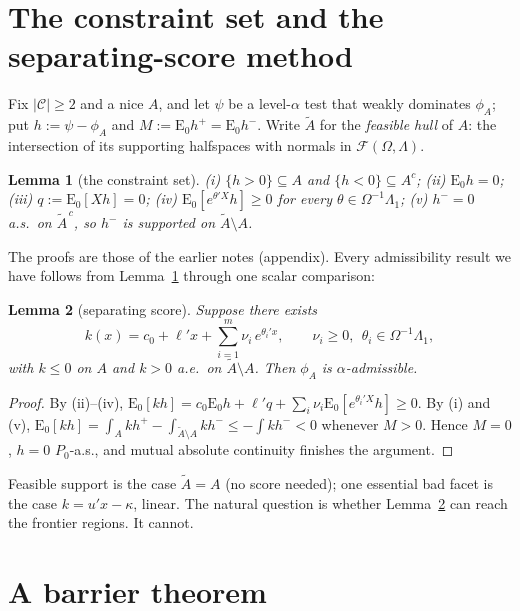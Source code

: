 \documentclass[12pt]{article}
\newtheorem{lemc}{Lemma}[section]
\theoremstyle{remark}
\newcommand{\E}{\mathrm E}
\newcommand{\cC}{\mathcal C}
\newcommand{\cF}{\mathcal F}
\newcommand{\wt}{\widetilde}
\begin{document}
\section{The constraint set and the separating-score method}

Fix $|\cC|\ge2$ and a nice $A$, and let $\psi$ be a level-$\alpha$ test that
weakly dominates $\phi_A$; put $h:=\psi-\phi_A$ and
$M:=\E_0h^+=\E_0h^-$. Write $\wt A$ for the \emph{feasible hull} of $A$:
the intersection of its supporting halfspaces with normals in
$\cF(\Omega,\Lambda)$.

\begin{lemc}[the constraint set]\label{lem:constraints}
(i) $\{h>0\}\subseteq A$ and $\{h<0\}\subseteq A^c$;
(ii) $\E_0h=0$;
(iii) $q:=\E_0[Xh]=0$;
(iv) $\E_0[e^{\theta'X}h]\ge0$ for every $\theta\in\Omega^{-1}\Lambda_1$;
(v) $h^-=0$ a.s.\ on $\wt A^{\,c}$, so $h^-$ is supported on
$\wt A\setminus A$.
\end{lemc}

The proofs are those of the earlier notes (appendix). Every admissibility
result we have follows from Lemma~\ref{lem:constraints} through one scalar
comparison:

\begin{lemc}[separating score]\label{lem:score}
Suppose there exists
\begin{equation}\label{eq:score-class}
k(x)=c_0+\ell'x+\sum_{i=1}^m\nu_i\,e^{\theta_i'x},
\qquad
\nu_i\ge0,\ \ \theta_i\in\Omega^{-1}\Lambda_1,
\end{equation}
with $k\le0$ on $A$ and $k>0$ a.e.\ on $\wt A\setminus A$. Then $\phi_A$ is
$\alpha$-admissible.
\end{lemc}

\begin{proof}
By (ii)--(iv), $\E_0[kh]=c_0\E_0h+\ell'q+\sum_i\nu_i\E_0[e^{\theta_i'X}h]
\ge0$. By (i) and (v), $\E_0[kh]=\int_Akh^+ -\int_{\wt A\setminus A}kh^-
\le-\int kh^-<0$ whenever $M>0$. Hence $M=0$, $h=0$ $P_0$-a.s., and mutual
absolute continuity finishes the argument.
\end{proof}

Feasible support is the case $\wt A=A$ (no score needed); one essential bad
facet is the case $k=u'x-\kappa$, linear. The natural question is whether
Lemma~\ref{lem:score} can reach the frontier regions. It cannot.

\section{A barrier theorem}
\end{document}
